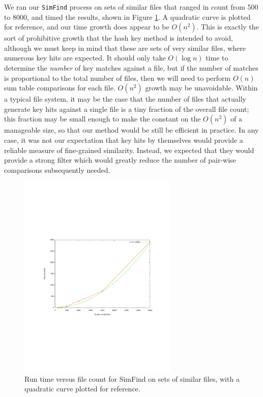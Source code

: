 \documentclass[10pt, twocolumn]{article}
\begin{document}
We ran our {\tt SimFind} process on sets of similar files that ranged in count from 500 to 8000, and timed the results, shown in Figure \ref{performanceTest}.  A quadratic curve is plotted for reference, and our time growth does appear to be $O(n^2)$.  This is exactly the sort of prohibitive growth that the hash key method is intended to avoid, although we must keep in mind that these are sets of very similar files, where numerous key hits are expected.  It should only take $O(\log n)$ time to determine the {\it number} of key matches against a file, but if the number of matches is proportional to the total number of files, then we will need to perform $O(n)$ sum table comparisons for each file.  $O(n^2)$ growth may be unavoidable.  Within a typical file system, it may be the case that the number of files that actually generate key hits against a single file is a tiny fraction of the overall file count;  this fraction may be small enough to make the constant on the $O(n^2)$ of a manageable size, so that our method would be still be efficient in practice.  In any case, it was not our expectation that key hits by themselves would provide a reliable measure of fine-grained similarity.  Instead, we expected that they would provide a strong filter which would greatly reduce the number of pair-wise comparisons subsequently needed.

 \begin{figure}[t] 
 \centering
\includegraphics[width= 3in]{performance.pdf}
\caption{Run time versus file count for SimFind on sets of similar files, with a quadratic curve plotted for reference.}
\label{performanceTest}
\end{figure}
\end{document}
